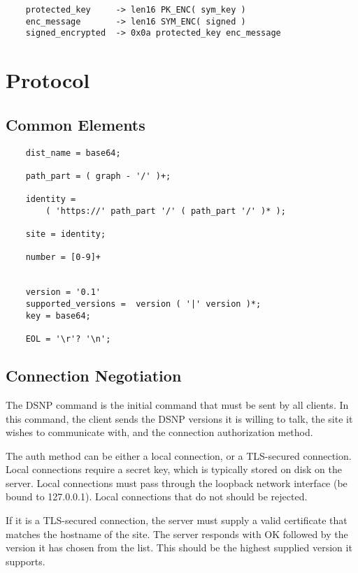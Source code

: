 \documentclass[letterpaper,11pt,oneside]{article}
\begin{document}
\vspace{10pt}
\begin{verbatim}
    protected_key     -> len16 PK_ENC( sym_key )
    enc_message       -> len16 SYM_ENC( signed )
    signed_encrypted  -> 0x0a protected_key enc_message
\end{verbatim}
\vspace{10pt}

%
%

\section{Protocol}

\subsection{Common Elements}

\vspace{10pt}
\begin{verbatim}
    dist_name = base64;

    path_part = ( graph - '/' )+;

    identity = 
        ( 'https://' path_part '/' ( path_part '/' )* );

    site = identity;

    number = [0-9]+           


    version = '0.1'
    supported_versions =  version ( '|' version )*;
    key = base64;

    EOL = '\r'? '\n';
\end{verbatim}

\subsection{Connection Negotiation}

The DSNP command is the initial command that must be sent by all clients. In
this command, the client sends the DSNP versions it is willing to talk, the
site it wishes to communicate with, and the connection authorization method.

The auth method can be either a local connection, or a TLS-secured connection.
Local connections require a secret key, which is typically stored on disk on
the server. Local connections must pass through the loopback network interface
(be bound to 127.0.0.1). Local connections that do not should be rejected.

If it is a TLS-secured connection, the server must supply a valid certificate
that matches the hostname of the site. The server responds with OK followed by
the version it has chosen from the list. This should be the highest supplied
version it supports.
\end{document}
